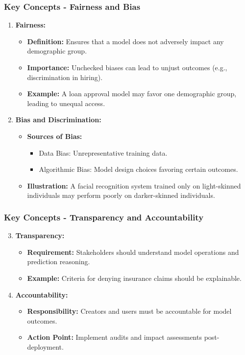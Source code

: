 \documentclass[aspectratio=169]{beamer}
\begin{document}
\begin{frame}[fragile]
    \frametitle{Key Concepts - Fairness and Bias}
    \begin{enumerate}
        \item \textbf{Fairness:}
            \begin{itemize}
                \item \textbf{Definition:} Ensures that a model does not adversely impact any demographic group.
                \item \textbf{Importance:} Unchecked biases can lead to unjust outcomes (e.g., discrimination in hiring).
                \item \textbf{Example:} A loan approval model may favor one demographic group, leading to unequal access.
            \end{itemize}

        \item \textbf{Bias and Discrimination:}
            \begin{itemize}
                \item \textbf{Sources of Bias:} 
                    \begin{itemize}
                        \item Data Bias: Unrepresentative training data.
                        \item Algorithmic Bias: Model design choices favoring certain outcomes.
                    \end{itemize}
                \item \textbf{Illustration:} A facial recognition system trained only on light-skinned individuals may perform poorly on darker-skinned individuals.
            \end{itemize}
    \end{enumerate}
\end{frame}

\begin{frame}[fragile]
    \frametitle{Key Concepts - Transparency and Accountability}
    \begin{enumerate}
        \setcounter{enumi}{2}
        \item \textbf{Transparency:}
            \begin{itemize}
                \item \textbf{Requirement:} Stakeholders should understand model operations and prediction reasoning.
                \item \textbf{Example:} Criteria for denying insurance claims should be explainable.
            \end{itemize}

        \item \textbf{Accountability:}
            \begin{itemize}
                \item \textbf{Responsibility:} Creators and users must be accountable for model outcomes.
                \item \textbf{Action Point:} Implement audits and impact assessments post-deployment.
            \end{itemize}
    \end{enumerate}
\end{frame}
\end{document}
